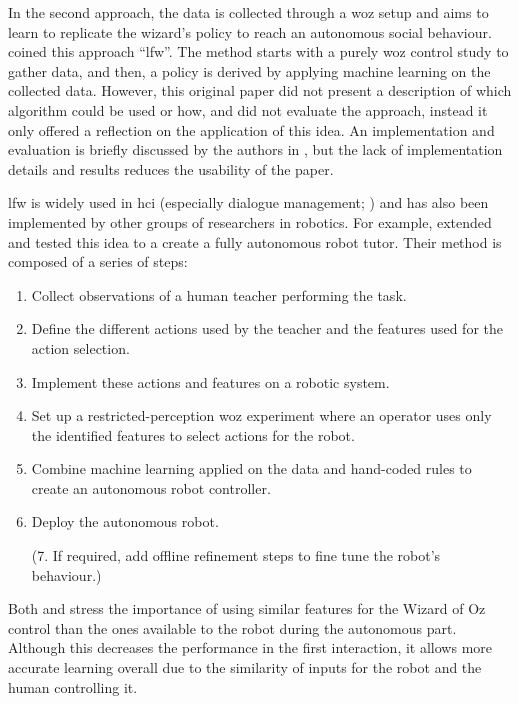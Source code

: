     In the second approach, the data is collected through a \gls{woz} setup and aims to learn to replicate the wizard's policy to reach an autonomous social behaviour. \cite{knox2014learning} coined this approach ``\gls{lfw}''. The method starts with a purely \gls{woz} control study to gather data, and then, a policy is derived by applying machine learning on the collected data. However, this original paper did not present a description of which algorithm could be used or how, and did not evaluate the approach, instead it only offered a reflection on the application of this idea. An implementation and evaluation is briefly discussed by the authors in \cite{knox2016learning}, but the lack of implementation details and results reduces the usability of the paper.
    
    \gls{lfw} is widely used in \gls{hci} (especially dialogue management; \citealt{rieser2008learning}) and has also been implemented by other groups of researchers in robotics. For example, \citet{sequeira2016discovering} extended and tested this idea to a create a fully autonomous robot tutor. Their method is composed of a series of steps: 
    \begin{enumerate}
    	\item Collect observations of a human teacher performing the task.
    	\item Define the different actions used by the teacher and the features used for the action selection.
    	\item Implement these actions and features on a robotic system.
    	\item Set up a restricted-perception \gls{woz} experiment where an operator uses only the identified features to select actions for the robot.
    	\item Combine machine learning applied on the data and hand-coded rules to create an autonomous robot controller.
    	\item Deploy the autonomous robot.
    	\item[(7.] If required, add offline refinement steps to fine tune the robot's behaviour.)
    \end{enumerate}

    Both \citet{knox2014learning} and \citet{sequeira2016discovering} stress the importance of using similar features for the Wizard of Oz control than the ones available to the robot during the autonomous part. Although this decreases the performance in the first interaction, it allows more accurate learning overall due to the similarity of inputs for the robot and the human controlling it.
        
